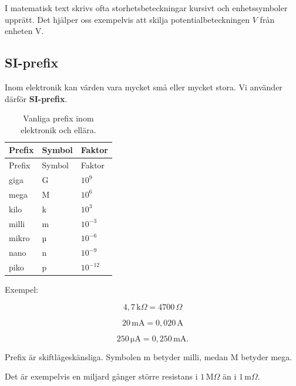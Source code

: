 \documentclass[
  swedish,
  11pt,
  a4paper,
  DIV=11,
  numbers=noendperiod,
  twoside,
  open=any]{scrreprt}
\begin{document}
I matematisk text skrivs ofta storhetsbeteckningar kursivt och
enhetssymboler upprätt. Det hjälper oss exempelvis att skilja
potentialbeteckningen \(V\) från enheten \(\mathrm{V}\).

\subsection{SI-prefix}\label{sec-grunder-si-prefix}

Inom elektronik kan värden vara mycket små eller mycket stora. Vi
använder därför \textbf{SI-prefix}.

\begin{longtable}[]{@{}lll@{}}
\caption{Vanliga prefix inom elektronik och
ellära.}\label{tbl-prefix}\tabularnewline
\toprule\noalign{}
Prefix & Symbol & Faktor \\
\midrule\noalign{}
\endfirsthead
\toprule\noalign{}
Prefix & Symbol & Faktor \\
\midrule\noalign{}
\endhead
\bottomrule\noalign{}
\endlastfoot
giga & G & \(10^9\) \\
mega & M & \(10^6\) \\
kilo & k & \(10^3\) \\
milli & m & \(10^{-3}\) \\
mikro & µ & \(10^{-6}\) \\
nano & n & \(10^{-9}\) \\
piko & p & \(10^{-12}\) \\
\end{longtable}

Exempel:

\[
4{,}7\,\mathrm{k}\Omega = 4700\,\Omega
\]

\[
20\,\mathrm{mA} = 0{,}020\,\mathrm{A}
\]

\[
250\,\mathrm{\mu A} = 0{,}250\,\mathrm{mA}.
\]

\begin{tcolorbox}[enhanced jigsaw, arc=.35mm, bottomrule=.15mm, bottomtitle=1mm, breakable, colback=white, colbacktitle=quarto-callout-important-color!10!white, colframe=quarto-callout-important-color-frame, coltitle=black, left=2mm, leftrule=.75mm, opacityback=0, opacitybacktitle=0.6, rightrule=.15mm, title=\textcolor{quarto-callout-important-color}{\faExclamation}\hspace{0.5em}{Skilj på stora och små bokstäver}, titlerule=0mm, toprule=.15mm, toptitle=1mm]

Prefix är skiftlägeskänsliga. Symbolen m betyder milli, medan M betyder
mega.

Det är exempelvis en miljard gånger större resistans i
\(1\,\mathrm{M}\Omega\) än i \(1\,\mathrm{m}\Omega\).

\end{tcolorbox}
\end{document}

